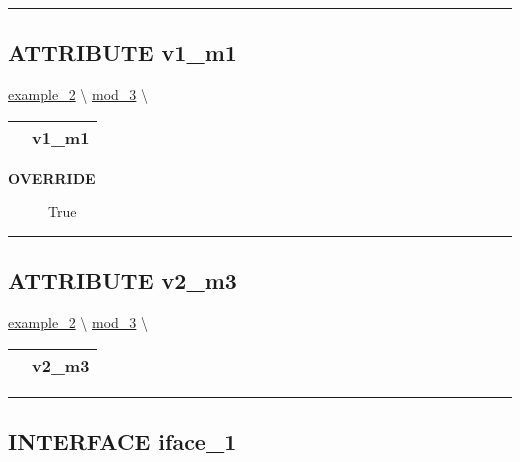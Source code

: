 \rule{\linewidth}{0.5pt}
\subsection*{\textsf{\colorbox{headtoc}{\color{white} ATTRIBUTE}
v1\_m1}}

\hypertarget{ecldoc:example_2.mod_3.v1_m1}{}
\hspace{0pt} \hyperlink{ecldoc:example_2}{example_2} \textbackslash 
\hspace{0pt} \hyperlink{ecldoc:example_2.mod_3}{mod_3} \textbackslash 

{\renewcommand{\arraystretch}{1.5}
\begin{tabularx}{\textwidth}{|>{\raggedright\arraybackslash}l|X|}
\hline
\hspace{0pt}\mytexttt{\color{red} } & \textbf{v1\_m1} \\
\hline
\end{tabularx}
}

\par

\par
\begin{description}
\item [\colorbox{tagtype}{\color{white} \textbf{\textsf{OVERRIDE}}}] \textbf{\underline{}} True
\end{description}

\rule{\linewidth}{0.5pt}
\subsection*{\textsf{\colorbox{headtoc}{\color{white} ATTRIBUTE}
v2\_m3}}

\hypertarget{ecldoc:example_2.mod_3.v2_m3}{}
\hspace{0pt} \hyperlink{ecldoc:example_2}{example_2} \textbackslash 
\hspace{0pt} \hyperlink{ecldoc:example_2.mod_3}{mod_3} \textbackslash 

{\renewcommand{\arraystretch}{1.5}
\begin{tabularx}{\textwidth}{|>{\raggedright\arraybackslash}l|X|}
\hline
\hspace{0pt}\mytexttt{\color{red} } & \textbf{v2\_m3} \\
\hline
\end{tabularx}
}

\par


\rule{\linewidth}{0.5pt}


\subsection*{\textsf{\colorbox{headtoc}{\color{white} INTERFACE}
iface\_1}}

